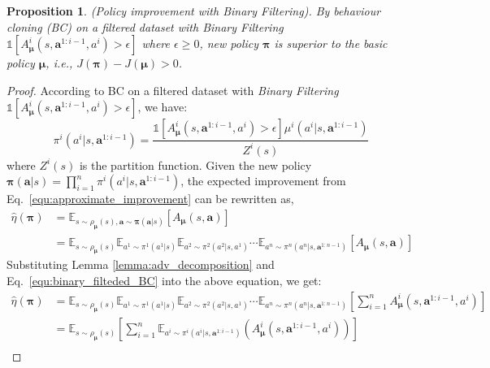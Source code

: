 \documentclass[11pt]{article}
\theoremstyle{plain}
\newtheorem{proposition}[theorem]{Proposition}
\theoremstyle{remark}
\begin{document}
\begin{proposition}
(Policy improvement with Binary Filtering). By behaviour cloning (BC) on a filtered dataset with Binary Filtering $\mathds{1}[A^{i}_{\boldsymbol{\mu}}(s, \boldsymbol{a}^{1:i-1}, a^i) > \epsilon]$ where $\epsilon \geq 0$, new policy $\boldsymbol{\pi}$ is superior to the basic policy $\boldsymbol{\mu}$, i.e., $J(\boldsymbol{\pi}) - J(\boldsymbol{\mu}) > 0$.
\end{proposition}
\begin{proof}
According to BC on a filtered dataset with \emph{Binary Filtering} $\mathds{1}[A^{i}_{\boldsymbol{\mu}}(s, \boldsymbol{a}^{1:i-1}, a^i) > \epsilon]$, we have:
\begin{equation}
\label{equ:binary_filteded_BC}
    \pi^{i}(a^i | s, \boldsymbol{a}^{1:i-1}) = \frac{ \mathds{1}[A^{i}_{\boldsymbol{\mu}}(s, \boldsymbol{a}^{1:i-1}, a^i) > \epsilon]\mu^{i}(a^i | s, \boldsymbol{a}^{1:i-1}) }{Z^{i}(s)}
\end{equation}
where $Z^{i}(s)$ is the partition function. Given the new policy $\boldsymbol{\pi}(\boldsymbol{a}|s) = \prod_{i=1}^{n} \pi^{i}(a^{i}| s, \boldsymbol{a}^{1: i - 1})$, the expected improvement from Eq.~\eqref{equ:approximate_improvement} can be rewritten as,
\begin{align*}
    \hat{\eta}(\boldsymbol{\pi}) &= \mathbb{E}_{s\sim \rho_{\boldsymbol{\mu}}(s), \boldsymbol{a} \sim \boldsymbol{\pi}(\boldsymbol{a} | s)}\left[ A_{\boldsymbol{\mu}}(s, \boldsymbol{a}) \right] \\
    &= \mathbb{E}_{s\sim \rho_{\boldsymbol{\mu}}(s)} \mathbb{E}_{a^1 \sim \pi^{1}(a^1 | s)} \mathbb{E}_{a^2 \sim \pi^{2}(a^2 | s, a^1)} \cdots \mathbb{E}_{a^n \sim \pi^{n}(a^n | s, \boldsymbol{a}^{1: n - 1})} \left[ A_{\boldsymbol{\mu}}(s, \boldsymbol{a}) \right]
\end{align*}
Substituting Lemma \ref{lemma:adv_decomposition} and Eq.~\eqref{equ:binary_filteded_BC} into the above equation, we get:
\begin{align}
    \hat{\eta}(\boldsymbol{\pi}) &= \mathbb{E}_{s\sim \rho_{\boldsymbol{\mu}}(s)} \mathbb{E}_{a^1 \sim \pi^{1}(a^1 | s)} \mathbb{E}_{a^2 \sim \pi^{2}(a^2 | s, a^1)} \cdots \mathbb{E}_{a^n \sim \pi^{n}(a^n | s, \boldsymbol{a}^{1: n - 1})} \left[ \sum_{i=1}^{n} A_{\boldsymbol{\mu}}^{i} (s, \boldsymbol{a}^{1:i - 1}, a^i) \right] \nonumber\\
    & = \mathbb{E}_{s\sim \rho_{\boldsymbol{\mu}}(s)} \left[ \sum_{i = 1}^{n} \mathbb{E}_{a^{i} \sim \pi^{i} (a^{i} | s, \boldsymbol{a}^{1:i - 1})} \left( A_{\boldsymbol{\mu}}^{i} (s, \boldsymbol{a}^{1:i - 1}, a^i) \right) \right] \nonumber\\

\end{align}
\end{proof}
\end{document}
